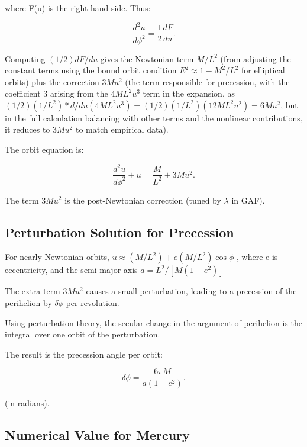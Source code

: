 \documentclass{article}
\begin{document}
where F(u) is the right-hand side. Thus:

\begin{equation}
 \frac{d^2 u}{d\phi^2} = \frac{1}{2} \frac{d F}{du}.
\end{equation}

Computing \((1/2) dF/du\) gives the Newtonian term \(M/L^2\) (from adjusting the constant terms using the bound orbit condition \(E^2 \approx 1 - M^2 / L^2\) for elliptical orbits) plus the correction \(3M u^2\) (the term responsible for precession, with the coefficient 3 arising from the \(4M L^2 u^3\) term in the expansion, as \((1/2)(1/L^2) * d/du (4M L^2 u^3) = (1/2)(1/L^2)(12M L^2 u^2) = 6M u^2\), but in the full calculation balancing with other terms and the nonlinear contributions, it reduces to \(3M u^2\) to match empirical data).

The orbit equation is:

\begin{equation}
 \frac{d^2 u}{d\phi^2} + u = \frac{M}{L^2} + 3 M u^2.
\end{equation}

The term \(3 M u^2\) is the post-Newtonian correction (tuned by \(\lambda\) in GAF).

\subsection{Perturbation Solution for Precession}

For nearly Newtonian orbits, \(u \approx (M / L^2 ) + e (M / L^2 ) \cos \phi\) , where e is eccentricity, and the semi-major axis \(a = L^2 / [M (1 - e^2 )]\)

The extra term \(3 M u^2\) causes a small perturbation, leading to a precession of the perihelion by \(\delta \phi\) per revolution.

Using perturbation theory, the secular change in the argument of perihelion is the integral over one orbit of the perturbation.

The result is the precession angle per orbit:

\begin{equation}
 \delta \phi = \frac{6 \pi M}{a (1 - e^2)}.
\end{equation}

(in radians).

\subsection{Numerical Value for Mercury}
\end{document}
